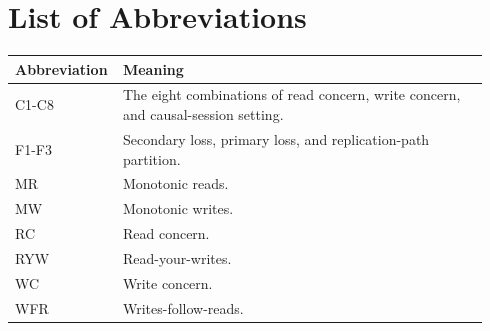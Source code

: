 \section*{List of Abbreviations}

\begin{tabular}{@{}p{0.18\linewidth}p{0.76\linewidth}@{}}
\toprule
Abbreviation & Meaning \\
\midrule
C1-C8 & The eight combinations of read concern, write concern, and causal-session setting. \\
F1-F3 & Secondary loss, primary loss, and replication-path partition. \\
MR & Monotonic reads. \\
MW & Monotonic writes. \\
RC & Read concern. \\
RYW & Read-your-writes. \\
WC & Write concern. \\
WFR & Writes-follow-reads. \\
\bottomrule
\end{tabular}
